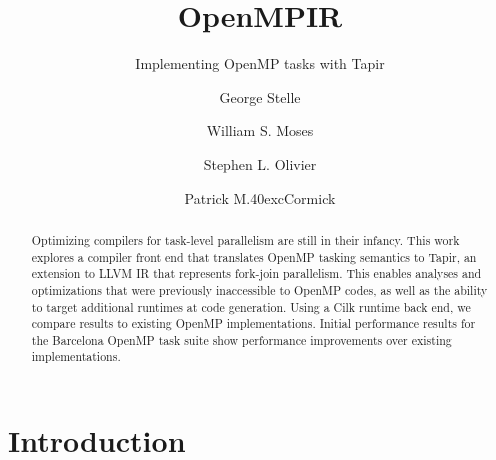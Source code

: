 \documentclass[sigconf]{acmart}
\newcommand{\McCormick} {M\raise .40ex\hbox{c}Cormick}
\begin{document}

\title{OpenMPIR}
\subtitle{Implementing OpenMP tasks with Tapir}

\author{George Stelle}

\author{William S. Moses}

\author{Stephen L. Olivier}

\author{Patrick \McCormick}

\renewcommand{\shortauthors}{G. Stelle et al.}

\begin{abstract}
Optimizing compilers for task-level parallelism are still in their infancy.
This work explores a compiler front end that translates OpenMP tasking
semantics to Tapir, an extension to LLVM IR that represents fork-join
parallelism. This enables analyses and optimizations that were previously
inaccessible to OpenMP codes, as well as the ability to target additional
runtimes at code generation. Using a Cilk runtime back end, we compare results
to existing OpenMP implementations.  Initial performance results for the
Barcelona OpenMP task suite show performance improvements over existing
implementations.
\end{abstract}

\maketitle

\section{Introduction} \label{Sec:Introduction}
 
\end{document}
